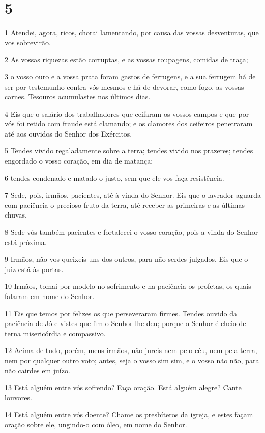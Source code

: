 \chapter{5}

\par 1 Atendei, agora, ricos, chorai lamentando, por causa das vossas desventuras, que vos sobrevirão.
\par 2 As vossas riquezas estão corruptas, e as vossas roupagens, comidas de traça;
\par 3 o vosso ouro e a vossa prata foram gastos de ferrugens, e a sua ferrugem há de ser por testemunho contra vós mesmos e há de devorar, como fogo, as vossas carnes. Tesouros acumulastes nos últimos dias.
\par 4 Eis que o salário dos trabalhadores que ceifaram os vossos campos e que por vós foi retido com fraude está clamando; e os clamores dos ceifeiros penetraram até aos ouvidos do Senhor dos Exércitos.
\par 5 Tendes vivido regaladamente sobre a terra; tendes vivido nos prazeres; tendes engordado o vosso coração, em dia de matança;
\par 6 tendes condenado e matado o justo, sem que ele vos faça resistência.
\par 7 Sede, pois, irmãos, pacientes, até à vinda do Senhor. Eis que o lavrador aguarda com paciência o precioso fruto da terra, até receber as primeiras e as últimas chuvas.
\par 8 Sede vós também pacientes e fortalecei o vosso coração, pois a vinda do Senhor está próxima.
\par 9 Irmãos, não vos queixeis uns dos outros, para não serdes julgados. Eis que o juiz está às portas.
\par 10 Irmãos, tomai por modelo no sofrimento e na paciência os profetas, os quais falaram em nome do Senhor.
\par 11 Eis que temos por felizes os que perseveraram firmes. Tendes ouvido da paciência de Jó e vistes que fim o Senhor lhe deu; porque o Senhor é cheio de terna misericórdia e compassivo.
\par 12 Acima de tudo, porém, meus irmãos, não jureis nem pelo céu, nem pela terra, nem por qualquer outro voto; antes, seja o vosso sim sim, e o vosso não não, para não cairdes em juízo.
\par 13 Está alguém entre vós sofrendo? Faça oração. Está alguém alegre? Cante louvores.
\par 14 Está alguém entre vós doente? Chame os presbíteros da igreja, e estes façam oração sobre ele, ungindo-o com óleo, em nome do Senhor.
